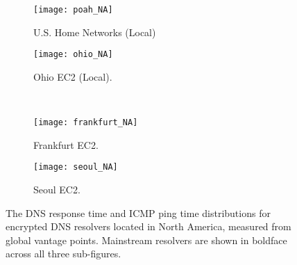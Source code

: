 \begin{figure*}[h!]
\centering
\begin{subfigure}[b]{0.35\textwidth}
\texttt{[image: poah\_NA]}
    \caption{U.S. Home Networks (Local)}
\end{subfigure}
%
\begin{subfigure}[b]{0.35\textwidth}
\texttt{[image: ohio\_NA]}
    \caption{Ohio EC2 (Local).}
\end{subfigure}
%
\hfill \\
\begin{subfigure}[b]{0.35\textwidth}
\texttt{[image: frankfurt\_NA]}
    \caption{Frankfurt EC2.}
\end{subfigure}
%
\begin{subfigure}[b]{0.35\textwidth}
\texttt{[image: seoul\_NA]}
\caption{Seoul EC2.}
\end{subfigure}
\caption{The DNS response time and ICMP ping time distributions for
    encrypted DNS resolvers located in North America, measured from global vantage points.
    Mainstream resolvers are shown in boldface across all three
    sub-figures.}
\label{fig:dns-NA}
\end{figure*}

